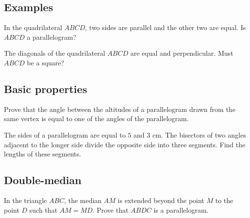\documentclass{article}
\begin{document}
\CreateTitle

\subsection*{Examples}

\problem

In the quadrilateral $ABCD$, two sides are parallel and the other two are equal. Is $ABCD$ a parallelogram?

\eproblem

\problem

The diagonals of the quadrilateral $ABCD$ are equal and perpendicular. Must $ABCD$ be a square?

\eproblem

\subsection*{Basic properties}

\problem

Prove that the angle between the altitudes of a parallelogram drawn from the same vertex is equal to one of the angles of the parallelogram.

\eproblem

\problem

The sides of a parallelogram are equal to $5$ and $3$ cm. The bisectors of two angles adjacent to the longer side divide the opposite side into three segments. Find the lengths of these segments.

\eproblem

\subsection*{Double-median}

\problem

In the triangle $ABC$, the median $AM$ is extended beyond the point $M$ to the point $D$ such that $AM = MD$. Prove that $ABDC$ is a parallelogram.

\eproblem
\end{document}
